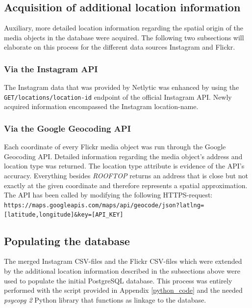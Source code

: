 \subsection{Acquisition of additional location information} \label{add_location_data}
Auxiliary, more detailed location information regarding the spatial origin of the media objects in the database were acquired. The following two subsections will elaborate on this process for the different data sources Instagram and Flickr.

\subsubsection*{Via the Instagram API} \label{geolocation_via_instagramapi}
The Instagram data that was provided by Netlytic was enhanced by using the \\ \texttt{GET/locations/location-id} endpoint of the official Instagram API. Newly acquired information encompassed the Instagram location-name.

\subsubsection*{Via the Google Geocoding API} \label{geocoding_api}
Each coordinate of every Flickr media object was run through the Google Geocoding API. Detailed information regarding the media object's address and location type was returned. The location type attribute is evidence of the API's accuracy. Everything besides \small{\textit{ROOFTOP}} returns an address that is close but not exactly at the given coordinate and therefore represents a spatial approximation. The API has been called by modifying the following HTTPS-request:\\
\texttt{\footnotesize{https://maps.googleapis.com/maps/api/geocode/json?latlng=[latitude,longitude]\&key=[API\_KEY]}}

\subsection{Populating the database} \label{populate_db}
The merged Instagram CSV-files and the Flickr CSV-files which were extended by the additional location information described in the subsections above were used to populate the initial PostgreSQL database. This process was entirely performed with the script provided in Appendix \ref{python_code} and the needed \textit{psycopg 2} Python library that functions as linkage to the database.

